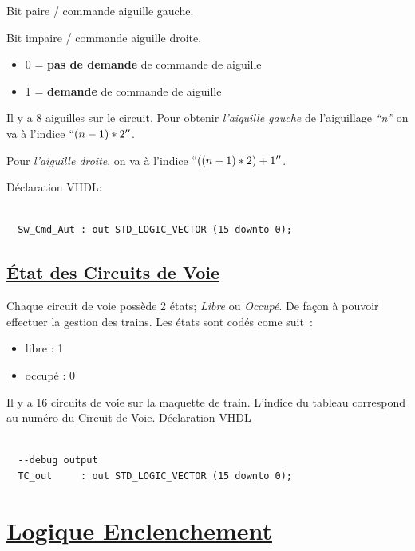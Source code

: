 Bit paire / commande aiguille gauche.

Bit impaire / commande aiguille droite.

\medskip

\begin{itemize}
\item 0 = \textbf{pas de demande} de commande de aiguille
\item 1 = \textbf{demande} de commande de aiguille
\end{itemize}

\medskip


Il y a 8 aiguilles sur le circuit. Pour obtenir \emph{l'aiguille gauche} de
l'aiguillage \emph{``n''} on va à l'indice $``(n-1)*2''$.

Pour \emph{l'aiguille droite}, on va à l'indice $``((n-1)*2) + 1''$.

\bigskip

Déclaration VHDL:
\begin{lstlisting}[style=vhdl]

  Sw_Cmd_Aut : out STD_LOGIC_VECTOR (15 downto 0);

\end{lstlisting}


  
\subsection{\underline{\'Etat des Circuits de Voie}}
\label{sec:st_sig}

Chaque circuit de voie possède 2 états; \emph{Libre} ou
\emph{Occupé}. De façon à pouvoir effectuer la gestion des trains.
Les états sont codés come suit~:
\begin{itemize}
  \item libre : 1
  \item occupé : 0
\end{itemize}  

Il y a 16 circuits de voie sur la maquette de train. L'indice du
tableau correspond au numéro du Circuit de Voie.
\medskip
\medskip
Déclaration VHDL
\begin{lstlisting}[style=vhdl]

  --debug output
  TC_out     : out STD_LOGIC_VECTOR (15 downto 0);

\end{lstlisting}

\newpage

\section{\underline{Logique Enclenchement}}
\label{sec:log_enc}

